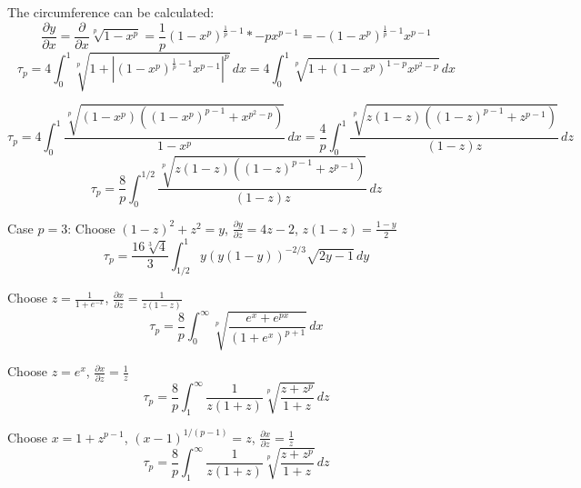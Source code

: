 \documentclass[]{article}
\newcommand{\paren}[1]{{\left(#1\right)}}
\newcommand{\abs}[1]{{\left\lvert#1\right\rvert}}
\begin{document}
The circumference can be calculated:
\begin{equation}
\frac{\partial y}{\partial x}=\frac{\partial}{\partial x}\sqrt[p]{1-x^p}
=\frac{1}{p}\paren{1-x^p}^{\frac{1}{p}-1}*-px^{p-1}
=-\paren{1-x^p}^{\frac{1}{p}-1}x^{p-1}
\end{equation}
\begin{equation}
\tau_p=4\int_{0}^{1} \sqrt[p]{1+\abs{\paren{1-x^p}^{\frac{1}{p}-1}x^{p-1}}^p} \,dx
=
4\int_{0}^{1} \sqrt[p]{1+{\paren{1-x^p}^{1-p}x^{p^2-p}}} \,dx
\end{equation}




\begin{equation}
\tau_p=
4\int_{0}^{1} \frac{\sqrt[p]{\paren{1-x^p}\paren{\paren{1-x^p}^{p-1}+x^{p^2-p}}}}{1-x^p} \,dx
=
\frac{4}{p}\int_{0}^{1} \frac{\sqrt[p]{z\paren{1-z}\paren{\paren{1-z}^{p-1}+z^{p-1}}}}{\paren{1-z}z} \,dz
\end{equation}
\begin{equation}
\tau_p=
\frac{8}{p}\int_{0}^{1/2} \frac{\sqrt[p]{z\paren{1-z}\paren{\paren{1-z}^{p-1}+z^{p-1}}}}{\paren{1-z}z} \,dz
\end{equation}

Case $p=3$: Choose $\paren{1-z}^2+z^2=y$, $\frac{\partial y}{\partial z}=4z-2$, $z\paren{1-z}=\frac{1-y}{2}$
\begin{equation}
\tau_p=
\frac{16\sqrt[3]{4}}{3}
\int_{1/2}^{1} y \paren{y\paren{1-y}}^{-2/3} \sqrt{2y-1}\,dy
\end{equation}



Choose $z=\frac{1}{1+e^{-x}}$, $\frac{\partial x}{\partial z}=\frac{1}{z\paren{1-z}}$
\begin{equation}
\tau_p=
\frac{8}{p}\int_{0}^{\infty} \sqrt[p]{ \frac{e^{x}+e^{p {x}}}{\paren{1+e^{x}}^{p+1}} } \,dx
\end{equation}

Choose $z=e^{x}$, $\frac{\partial x}{\partial z}=\frac{1}{z}$
\begin{equation}
\tau_p=
\frac{8}{p}\int_{1}^{\infty} \frac{1}{z\paren{1+z}}\sqrt[p]{ \frac{z+z^{p}}{1+z} } \,dz
\end{equation}

Choose $x=1+z^{p-1}$, $\paren{x-1}^{1/\paren{p-1}}=z$, $\frac{\partial x}{\partial z}=\frac{1}{z}$
\begin{equation}
\tau_p=
\frac{8}{p}\int_{1}^{\infty} \frac{1}{z\paren{1+z}}\sqrt[p]{ \frac{z+z^{p}}{1+z} } \,dz
\end{equation}
\end{document}

